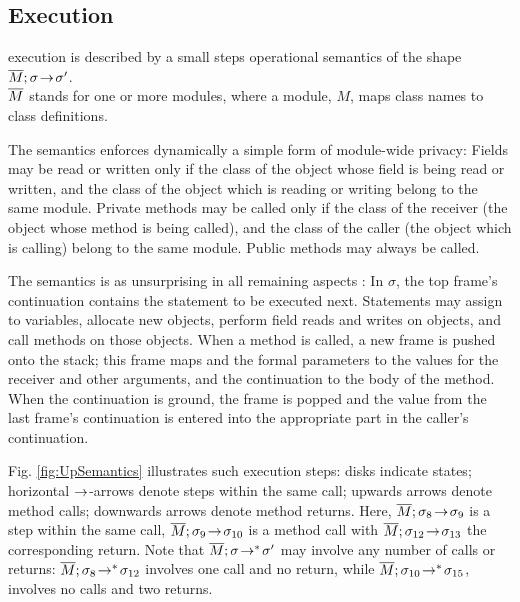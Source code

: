   

  
\subsection{\LangOO Execution}
\label{sect:execution}

 \LangOO execution is described by a small steps operational semantics of the shape $\overline{M};\sigma\! \rightarrow\! {\sigma'}$.\\
  $\overline{M}$ stands for one or more modules, where a
  module,  $M$, maps class names to class definitions. 
   
{The semantics enforces dynamically a simple form of module-wide privacy: 
Fields may be read or written only if the class of the object whose field is being read or written, and the class of the object which is reading or writing belong to the same module.}
Private methods may be called only if the class of the receiver (the object whose method is being called), and the class of the caller (the object which is calling) belong to the same module.
Public methods may always be called.

The semantics is as unsurprising in all remaining aspects  :  
In $\sigma$, the  top frame's continuation contains the statement to be  executed next.  
 Statements may assign to variables, allocate new objects, 
perform field reads and writes on objects, and
 call methods on those objects. 
When a method is called, a new frame is pushed onto the stack; this frame  maps  and the formal parameters to  the values for the receiver and other arguments, and the continuation to the body of the method.  When the continuation is ground, the frame is popped and the value from the last frame's continuation is entered into the appropriate part in the caller's continuation. 


{Fig. \ref{fig:UpSemantics} illustrates  such  execution steps:  disks indicate states;
 horizontal $\rightarrow$-arrows denote   steps  within the same  call; upwards arrows denote  method calls;
 downwards arrows denote method returns. %
 Here,   $\overline{M};\sigma_8\! \rightarrow\! {\sigma_9} $ is a step within the same call, $\overline{M};\sigma_9\! \rightarrow\! {\sigma_{10}} $ is a method call   
with $\overline{M};\sigma_{12}\! \rightarrow\! {\sigma_{13}} $ %
the corresponding return. 
 {Note that  $\overline{M};\sigma\! \rightarrow^*\! {\sigma'}$ may involve  any number of  calls or returns: 
 $\overline{M};\sigma_8\! \rightarrow^*\! {\sigma_{12}}$ involves one call and no return,
while $\overline{M};\sigma_{10}\! \rightarrow^*\! {\sigma_{15}}$,   involves no calls and two returns.
}
} 

